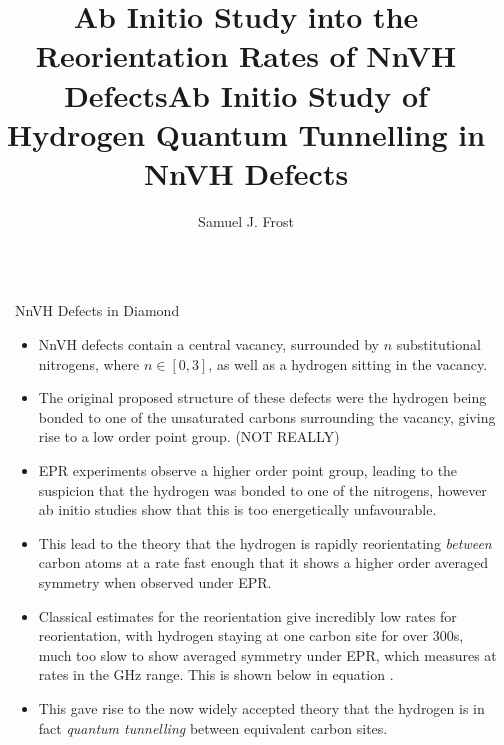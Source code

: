 \documentclass[final]{beamer}
\title{Ab Initio Study into the Reorientation Rates of NnVH Defects}
\title{Ab Initio Study of Hydrogen Quantum Tunnelling in NnVH Defects}
\author{Samuel J. Frost}
\institute[shortinst]{University of Warwick}
\newlength{\sepwidth}
\newlength{\colwidth}
\newcommand{\separatorcolumn}{\begin{column}{\sepwidth}\end{column}}
\begin{document}
\begin{frame}[t]
\begin{columns}[t]
\separatorcolumn

\begin{column}{\colwidth}
    
  \begin{block}{NnVH Defects in Diamond}
    \begin{itemize}
        \item NnVH defects contain a central vacancy, surrounded by $n$ substitutional nitrogens, where $n \in [0, 3]$, as well as a hydrogen sitting in the vacancy.
        \item The original proposed structure of these defects were the hydrogen being bonded to one of the unsaturated carbons surrounding the vacancy, giving rise to a low order point group. (NOT REALLY)
        \item EPR experiments observe a higher order point group, leading to the suspicion that the hydrogen was bonded to one of the nitrogens, however ab initio studies show that this is too energetically unfavourable.
        \item This lead to the theory that the hydrogen is rapidly reorientating \emph{between} carbon atoms at a rate fast enough that it shows a higher order averaged symmetry when observed under EPR.
        \item Classical estimates for the reorientation give incredibly low rates for reorientation, with hydrogen staying at one carbon site for over 300s, much too slow to show averaged symmetry under EPR, which measures at rates in the GHz range. This is shown below in equation .
        \item This gave rise to the now widely accepted theory that the hydrogen is in fact \emph{quantum tunnelling} between equivalent carbon sites.
    \end{itemize}


\end{block}
\end{column}
\end{columns}
\end{frame}
\end{document}
